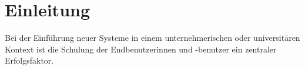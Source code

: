\chapter{Einleitung}
Bei der Einführung neuer Systeme in einem unternehmerischen oder universitären
Kontext ist die Schulung der Endbenutzerinnen und -benutzer ein zentraler Erfolgsfaktor.



